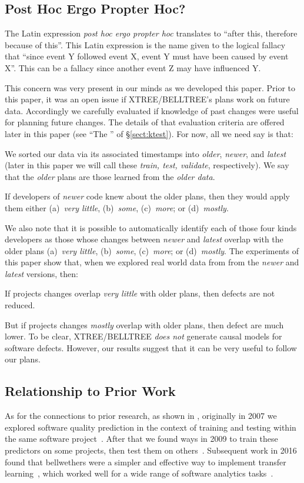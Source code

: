 \subsection{Post Hoc Ergo Propter Hoc?}\label{sect:hoc}

The Latin expression {\em post hoc ergo propter hoc}
 translates to ``after this, therefore because of this''.
This Latin expression is the name given to
the logical fallacy that
``since event Y followed event X, event Y must have been caused by event X''.
This can be a fallacy since another event Z may have influenced Y.

This concern was very
present in our minds as we developed this paper.
Prior to this paper, it was an open issue if 
XTREE/BELLTREE's plans  work on future data. Accordingly
we carefully evaluated if knowledge of past changes were  useful for 
planning future changes.
The details of that evaluation criteria are offered later in this paper
(see ``The {\ktest}'' of \S\ref{sect:ktest}).  For now, all we need say is that:
\bi
\item
We sorted our data via its associated timestamps
into {\em older}, {\em newer}, and {\em latest}
(later in this paper we will call these {\em train, test, validate}, respectively).
We say that the 
{\em older} plans are those learned from   the  {\em older data}. 
\item
If developers of   {\em newer} code knew about  the  older plans,
then they would  apply them
either (a)~{\em very little}, (b)~{\em some}, (c)~{\em more}; or (d)~{\em mostly}. 
\item
We also note that  it is possible to  automatically identify
each of those four kinds developers  as those whose changes  
between {\em newer} and {\em latest}
overlap
with  the older plans  (a)~{\em very little}, (b)~{\em some}, (c)~{\em more}; or (d)~{\em mostly}. 
\ei
The experiments of this paper show that,
 when we explored real world data from
from the {\em newer} and {\em latest} versions, then:
\bi
\item If projects changes overlap  {\em very little } 
with  older plans, then   defects are not reduced.
\item But if projects changes {\em mostly} overlap   with   older plans, then   defect  are  much lower.
\ei
To be clear,   XTREE/BELLTREE {\em does not} generate causal
models for software defects. However, our results  suggest that it can be very useful to follow
our plans.

\subsection{Relationship to Prior Work}
\label{sect:our_prior}
As for the connections to prior research, 
as shown in , originally in 2007 we explored software quality prediction in the context of training and testing within the same software project~\citep{menzies07}. After that we found ways in 2009 to train these predictors on some projects, then test them on others~\citep{turhan09}. Subsequent work in 2016 found that bellwethers were a simpler and effective way to implement transfer learning~\citep{krishna16}, which worked well for a wide range of software analytics tasks~\citep{krishna17b}. 

